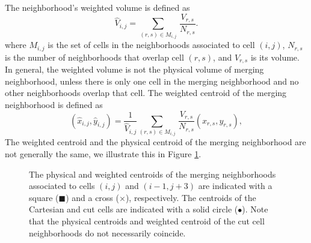 The neighborhood's weighted volume is defined as
\begin{equation}
\label{voldef}
{\widehat V}_{i,j} =  \sum_{(r,s) \in M_{i,j} } \,  \frac{V_{r,s}}{N_{r,s}}.
\end{equation}
where $M_{i,j}$ is the set of cells in the neighborhoods associated to cell $(i,j)$, $N_{r,s}$ is the number of neighborhoods that overlap cell $(r,s)$, and $V_{r,s}$ is its volume.
In general, the weighted volume is not the physical volume of merging neighborhood, unless there is only one cell in the merging neighborhood and no other neighborhoods overlap that cell.  
The weighted centroid of the merging neighborhood is defined as
\begin{equation}
\label{centroiddef}
({\widehat x}_{i,j},{\widehat y}_{i,j}) = \frac{1}{\widehat V_{i,j}} \sum_{(r,s) \in M_{i,j} } \,  \frac{V_{r,s}}{N_{r,s}}(x_{r,s},y_{r,s}),
\end{equation}
The weighted centroid and the physical centroid of the merging neighborhood are not generally the same, we illustrate this in Figure \ref{fig:centroids}.



\begin{figure}[h]
    \centering
    \hspace*{.5in}
    \caption{\sf The physical and weighted centroids of the merging neighborhoods associated to cells $(i,j)$ and $(i-1, j+3)$ are indicated with a square ($\blacksquare$) and a cross ($\times$), respectively. The centroids of the Cartesian and cut cells are indicated with a solid circle ($\bullet$).  Note that the physical centroids and weighted centroid of the cut cell neighborhoods do not necessarily coincide.}
    \label{fig:centroids}
\end{figure}

